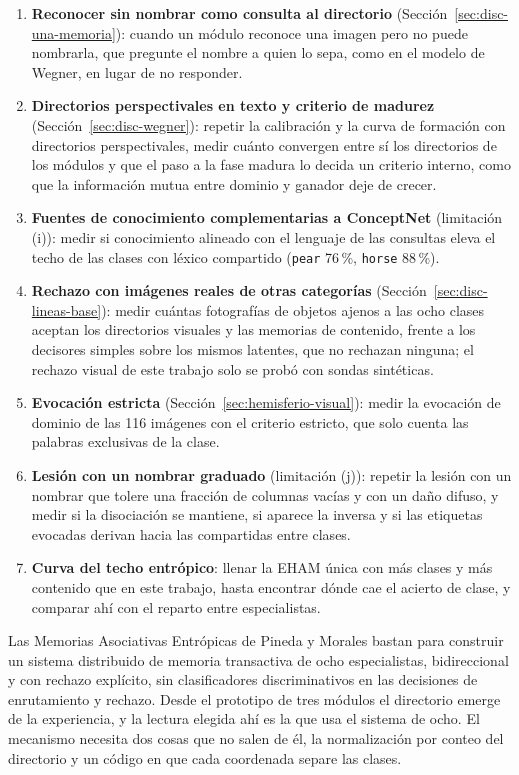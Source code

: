 \begin{enumerate}
    formar el directorio, y que el directorio se reorganice cuando un módulo sale del
    grupo o entra en él.
    \item \textbf{Reconocer sin nombrar como consulta al directorio}
    (Sección~\ref{sec:disc-una-memoria}): cuando un módulo reconoce una imagen pero no
    puede nombrarla, que pregunte el nombre a quien lo sepa, como en el modelo de
    Wegner, en lugar de no responder.
    \item \textbf{Directorios perspectivales en texto y criterio de madurez}
    (Sección~\ref{sec:disc-wegner}): repetir la calibración y la curva de formación con
    directorios perspectivales, medir cuánto convergen entre sí los directorios de los
    módulos y que el paso a la fase madura lo decida un criterio interno, como que la
    información mutua entre dominio y ganador deje de crecer.
    \item \textbf{Fuentes de conocimiento complementarias a ConceptNet} (limitación
    (i)): medir si conocimiento alineado con el lenguaje de las consultas eleva el techo
    de las clases con léxico compartido (\texttt{pear} 76\,\%, \texttt{horse} 88\,\%).
    \item \textbf{Rechazo con imágenes reales de otras categorías}
    (Sección~\ref{sec:disc-lineas-base}): medir cuántas fotografías de objetos ajenos a
    las ocho clases aceptan los directorios visuales y las memorias de contenido, frente
    a los decisores simples sobre los mismos latentes, que no rechazan ninguna; el
    rechazo visual de este trabajo solo se probó con sondas sintéticas.
    \item \textbf{Evocación estricta} (Sección~\ref{sec:hemisferio-visual}): medir la
    evocación de dominio de las 116 imágenes con el criterio estricto, que solo cuenta
    las palabras exclusivas de la clase.
    \item \textbf{Lesión con un nombrar graduado} (limitación (j)): repetir la lesión con
    un nombrar que tolere una fracción de columnas vacías y con un daño difuso, y medir
    si la disociación se mantiene, si aparece la inversa y si las etiquetas evocadas
    derivan hacia las compartidas entre clases.
    \item \textbf{Curva del techo entrópico}: llenar la EHAM única con más clases y más
    contenido que en este trabajo, hasta encontrar dónde cae el acierto de clase, y
    comparar ahí con el reparto entre especialistas.
\end{enumerate}

\bigskip

Las Memorias Asociativas Entrópicas de Pineda y Morales bastan para construir un sistema
distribuido de memoria transactiva de ocho especialistas, bidireccional y con rechazo
explícito, sin clasificadores discriminativos en las decisiones de enrutamiento y
rechazo.
Desde el prototipo de tres módulos el directorio emerge de la experiencia, y la lectura elegida ahí
es la que usa el sistema de ocho.
El mecanismo necesita dos cosas que no salen de él, la normalización por conteo del
directorio y un código en que cada coordenada separe las clases.
